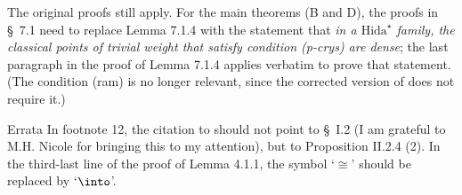 The original proofs still apply. For the  main theorems (B and D), the proofs in \S~7.1 need to replace Lemma 7.1.4 with the statement that \emph{in a $\text{Hida}^{\star}$ family, the classical points of trivial weight that satisfy condition \textup{(p-crys)}  are dense}; the last paragraph in the proof of Lemma 7.1.4 applies verbatim to prove that  statement. (The condition (ram) is no longer relevant, since the corrected  version of \cite[Theorem B]{nonsplit} does not require it.)


\begin{enonce*}[remark]{Errata} In  footnote 12, the citation to \cite{nek-heeg}  should  not point  to \S~I.2 (I am grateful to M.H. Nicole for bringing this to my attention), but to Proposition II.2.4 (2). In the third-last line of the proof of Lemma 4.1.1, the symbol `$\cong$' should be replaced by `$\into$'.
\end{enonce*}
